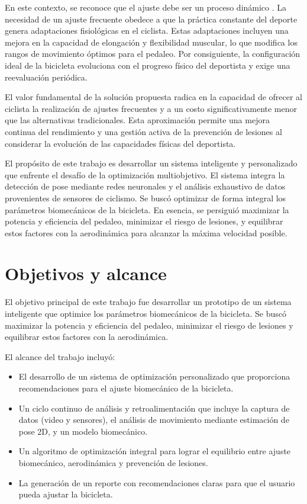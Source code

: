 En este contexto, se reconoce que el ajuste debe ser un proceso dinámico \citep{pubmed:staticvsdynamic, fonda2013validity}. La
necesidad de un ajuste frecuente obedece a que la práctica constante del
deporte genera adaptaciones fisiológicas en el ciclista. Estas adaptaciones
incluyen una mejora en la capacidad de elongación y flexibilidad muscular, lo
que modifica los rangos de movimiento óptimos para el pedaleo. Por
consiguiente, la configuración ideal de la bicicleta evoluciona con el progreso
físico del deportista y exige una reevaluación periódica.

El valor fundamental de la solución propuesta radica en la capacidad de ofrecer
al ciclista la realización de ajustes frecuentes y a un costo
significativamente menor que las alternativas tradicionales. Esta aproximación
permite una mejora continua del rendimiento y una gestión activa de la
prevención de lesiones al considerar la evolución de las capacidades físicas
del deportista.

El propósito de este trabajo es desarrollar un sistema inteligente y
personalizado que enfrente el desafío de la optimización multiobjetivo. El
sistema integra la detección de pose mediante redes neuronales y el análisis
exhaustivo de datos provenientes de sensores de ciclismo. Se buscó optimizar de
forma integral los parámetros biomecánicos de la bicicleta. En esencia, se
persiguió maximizar la potencia y eficiencia del pedaleo, minimizar el riesgo
de lesiones, y equilibrar estos factores con la aerodinámica para alcanzar la
máxima velocidad posible.

\section{Objetivos y alcance}
\label{obj}

El objetivo principal de este trabajo fue desarrollar un prototipo de un
sistema inteligente que optimice los parámetros biomecánicos de la bicicleta.
Se buscó maximizar la potencia y eficiencia del pedaleo, minimizar el riesgo de
lesiones y equilibrar estos factores con la aerodinámica.

El alcance del trabajo incluyó:

\begin{itemize}
    \item El desarrollo de un sistema de optimización personalizado que proporciona
          recomendaciones para el ajuste biomecánico de la bicicleta.
    \item Un ciclo continuo de análisis y retroalimentación que incluye la captura de
          datos (video y sensores), el análisis de movimiento mediante estimación de pose
          2D, y un modelo biomecánico.
    \item Un algoritmo de optimización integral para lograr el equilibrio entre ajuste
          biomecánico, aerodinámica y prevención de lesiones.
    \item La generación de un reporte con recomendaciones claras para que el usuario
          pueda ajustar la bicicleta.
\end{itemize}

